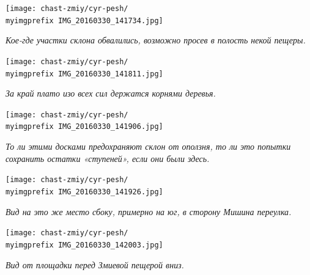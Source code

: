 \newpage
\vspace*{\fill}
\begin{center}
\texttt{[image: chast-zmiy/cyr-pesh/\\myimgprefix IMG\_20160330\_141734.jpg]}

\textit{Кое-где участки склона обвалились, возможно просев в полость некой пещеры.}
\end{center}
\vspace*{\fill}
\newpage







\vspace*{\fill}
\begin{center}
\texttt{[image: chast-zmiy/cyr-pesh/\\myimgprefix IMG\_20160330\_141811.jpg]}

\textit{За край плато изо всех сил держатся корнями деревья.}
\end{center}
\vspace*{\fill}
\newpage


\begin{center}
\texttt{[image: chast-zmiy/cyr-pesh/\\myimgprefix IMG\_20160330\_141906.jpg]}

\textit{То ли этими досками предохраняют склон от оползня, то ли это попытки сохранить остатки «ступеней», если они были здесь.}
\end{center}


\begin{center}
\texttt{[image: chast-zmiy/cyr-pesh/\\myimgprefix IMG\_20160330\_141926.jpg]}

\textit{Вид на это же место сбоку, примерно на юг, в сторону Мишина переулка.}
\end{center}

\newpage

\vspace*{\fill}
\begin{center}
\texttt{[image: chast-zmiy/cyr-pesh/\\myimgprefix IMG\_20160330\_142003.jpg]}

\textit{Вид от площадки перед Змиевой пещерой вниз.}
\end{center}
\vspace*{\fill}
\newpage

